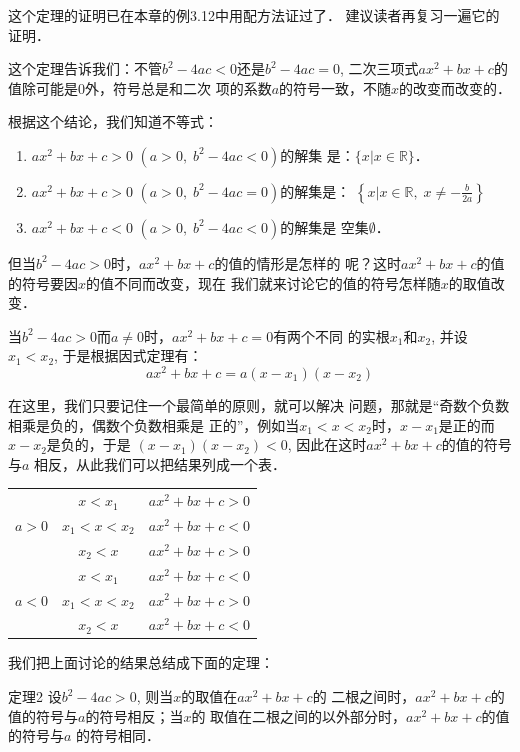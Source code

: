 这个定理的证明已在本章的例3.12中用配方法证过了．
建议读者再复习一遍它的证明．

这个定理告诉我们：不管$b^2-4ac<0$还是$b^2-4ac=0$,
二次三项式$ax^2+bx+c$的值除可能是0外，符号总是和二次
项的系数$a$的符号一致，不随$x$的改变而改变的．

根据这个结论，我们知道不等式：
\begin{enumerate}
    \item $ax^2+bx+c>0$ $(a>0,\; b^2-4ac<0)$的解集
    是：$\{x|x\in\mathbb{R}\}$．
    \item $ax^2+bx+c>0$ $(a>0,\;b^2-4ac=0)$的解集是：
    $\left\{x\Big|x\in\mathbb{R},\; x\ne -\frac{b}{2a}\right\}$
    \item $ax^2+bx+c<0$ $(a>0,\; b^2-4ac<0)$的解集是
    空集$\emptyset$．
\end{enumerate}

但当$b^2-4ac>0$时，$ax^2+bx+c$的值的情形是怎样的
呢？这时$ax^2+bx+c$的值的符号要因$x$的值不同而改变，现在
我们就来讨论它的值的符号怎样随$x$的取值改变．

当$b^2-4ac>0$而$a\ne 0$时，$ax^2+bx+c=0$有两个不同
的实根$x_1$和$x_2$, 并设$x_1<x_2$, 于是根据因式定理有：
\[ax^2+bx+c=a(x-x_1)(x-x_2)\]

在这里，我们只要记住一个最简单的原则，就可以解决
问题，那就是“奇数个负数相乘是负的，偶数个负数相乘是
正的”，例如当$x_1<x<x_2$时，$x-x_1$是正的而$x-x_2$是负的，于是
$(x-x_1)(x-x_2)<0$, 因此在这时$ax^2+bx+c$的值的符号与$a$
相反，从此我们可以把结果列成一个表．
\begin{center}
\begin{tabular}{c|c|c}
\hline
      & $x<x_1$ & $ax^2+bx+c>0$\\
 $a>0$   &  $x_1<x<x_2$ & $ax^2+bx+c<0$\\
    &  $x_2<x$ & $ax^2+bx+c>0$\\
\hline
  & $x<x_1$ & $ax^2+bx+c<0$\\
$a<0$&  $x_1<x<x_2$ & $ax^2+bx+c>0$\\
&  $x_2<x$ & $ax^2+bx+c<0$\\
\hline
\end{tabular}
\end{center}

我们把上面讨论的结果总结成下面的定理：
\begin{blk}{定理2}
    设$b^2-4ac>0$, 则当$x$的取值在$ax^2+bx+c$的
    二根之间时，$ax^2+bx+c$的值的符号与$a$的符号相反；当$x$的
    取值在二根之间的以外部分时，$ax^2+bx+c$的值的符号与$a$
    的符号相同． 
\end{blk}

